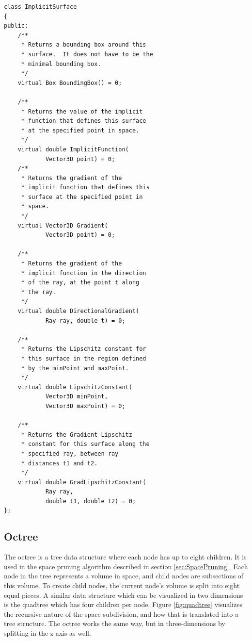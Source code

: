 \documentclass[conference]{acmsiggraph}
\begin{document}
\begin{verbatim}
class ImplicitSurface
{
public:
    /**
     * Returns a bounding box around this 
     * surface.  It does not have to be the 
     * minimal bounding box.
     */
    virtual Box BoundingBox() = 0;
    
    /**
     * Returns the value of the implicit 
     * function that defines this surface
     * at the specified point in space.
     */
    virtual double ImplicitFunction(
            Vector3D point) = 0;
    /**
     * Returns the gradient of the 
     * implicit function that defines this 
     * surface at the specified point in 
     * space.
     */
    virtual Vector3D Gradient(
            Vector3D point) = 0;
    
    /**
     * Returns the gradient of the 
     * implicit function in the direction
     * of the ray, at the point t along 
     * the ray.
     */
    virtual double DirectionalGradient(
            Ray ray, double t) = 0;
        
    /**
     * Returns the Lipschitz constant for 
     * this surface in the region defined 
     * by the minPoint and maxPoint.
     */
    virtual double LipschitzConstant(
            Vector3D minPoint, 
            Vector3D maxPoint) = 0;

    /**
     * Returns the Gradient Lipschitz 
     * constant for this surface along the
     * specified ray, between ray 
     * distances t1 and t2.
     */
    virtual double GradLipschitzConstant(
            Ray ray, 
            double t1, double t2) = 0;
};
\end{verbatim}

\subsection{Octree}
\label{sec:Octree}

The octree is a tree data structure where each node has up to eight 
children.  It is used in the space pruning algorithm described in
section \ref{sec:SpacePruning}.  Each node in the tree represents a volume
in space, and child nodes are subsections of this volume.  To create
child nodes, the current node's volume is split into eight equal pieces.
A similar data structure which can be visualized in two dimensions is
the quadtree which has four children per node.  Figure \ref{fig:quadtree}
visualizes the recursive nature of the space subdivision, and how that is translated
into a tree structure. 
The octree works the same way, but in three-dimensions by splitting in
the z-axis as well.
\end{document}
